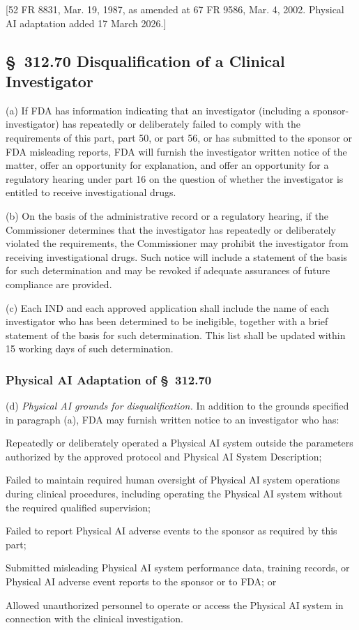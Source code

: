 [52 FR 8831, Mar. 19, 1987, as amended at 67 FR 9586, Mar. 4, 2002. Physical AI adaptation added 17 March 2026.]

\subsection{\S~312.70 Disqualification of a Clinical Investigator}

(a) If FDA has information indicating that an investigator (including a sponsor-investigator) has repeatedly or deliberately failed to comply with the requirements of this part, part 50, or part 56, or has submitted to the sponsor or FDA misleading reports, FDA will furnish the investigator written notice of the matter, offer an opportunity for explanation, and offer an opportunity for a regulatory hearing under part 16 on the question of whether the investigator is entitled to receive investigational drugs.

(b) On the basis of the administrative record or a regulatory hearing, if the Commissioner determines that the investigator has repeatedly or deliberately violated the requirements, the Commissioner may prohibit the investigator from receiving investigational drugs. Such notice will include a statement of the basis for such determination and may be revoked if adequate assurances of future compliance are provided.

(c) Each IND and each approved application shall include the name of each investigator who has been determined to be ineligible, together with a brief statement of the basis for such determination. This list shall be updated within 15 working days of such determination.

\subsubsection{Physical AI Adaptation of \S~312.70}

(d) \textit{Physical AI grounds for disqualification.} In addition to the grounds specified in paragraph (a), FDA may furnish written notice to an investigator who has:

\begin{description}[leftmargin=0.8cm,style=sameline]
\item[(i)] Repeatedly or deliberately operated a Physical AI system outside the parameters authorized by the approved protocol and Physical AI System Description;
\item[(ii)] Failed to maintain required human oversight of Physical AI system operations during clinical procedures, including operating the Physical AI system without the required qualified supervision;
\item[(iii)] Failed to report Physical AI adverse events to the sponsor as required by this part;
\item[(iv)] Submitted misleading Physical AI system performance data, training records, or Physical AI adverse event reports to the sponsor or to FDA; or
\item[(v)] Allowed unauthorized personnel to operate or access the Physical AI system in connection with the clinical investigation.
\end{description}

